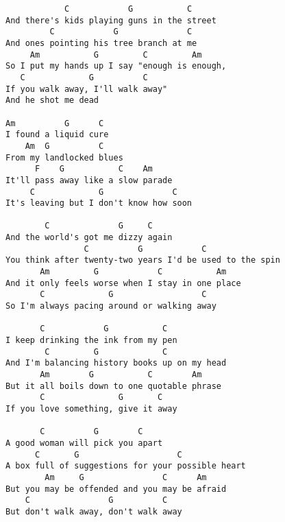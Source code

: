 \documentclass[leqno]{memoir}
\begin{document}
\begin{verbatim}
            C            G           C
And there's kids playing guns in the street
         C            G              C     
And ones pointing his tree branch at me
     Am           G         C         Am
So I put my hands up I say "enough is enough,
   C             G          C
If you walk away, I'll walk away"
And he shot me dead

Am          G      C
I found a liquid cure
    Am  G          C
From my landlocked blues
      F    G           C    Am
It'll pass away like a slow parade
     C             G              C
It's leaving but I don't know how soon 

        C              G     C
And the world's got me dizzy again
                C          G            C
You think after twenty-two years I'd be used to the spin
       Am         G            C           Am
And it only feels worse when I stay in one place
       C             G                  C
So I'm always pacing around or walking away

       C            G           C
I keep drinking the ink from my pen
        C         G             C
And I'm balancing history books up on my head
       Am        G           C        Am
But it all boils down to one quotable phrase
       C               G       C
If you love something, give it away

       C          G        C
A good woman will pick you apart
      C       G                    C
A box full of suggestions for your possible heart
        Am     G                C      Am
But you may be offended and you may be afraid
    C                G          C
But don't walk away, don't walk away
\end{verbatim}
\newpage
\end{document}
